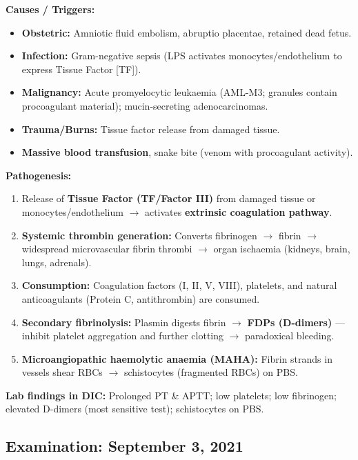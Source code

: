 \documentclass[11pt,a4paper]{article}
\begin{document}
\begin{ansbox}
\textbf{Causes / Triggers:}
\begin{itemize}[leftmargin=*]
    \item \textbf{Obstetric:} Amniotic fluid embolism, abruptio placentae, retained dead fetus.
    \item \textbf{Infection:} Gram-negative sepsis (LPS activates monocytes/endothelium to express Tissue Factor [TF]).
    \item \textbf{Malignancy:} Acute promyelocytic leukaemia (AML-M3; granules contain procoagulant material); mucin-secreting adenocarcinomas.
    \item \textbf{Trauma/Burns:} Tissue factor release from damaged tissue.
    \item \textbf{Massive blood transfusion}, snake bite (venom with procoagulant activity).
\end{itemize}

\textbf{Pathogenesis:}
\begin{enumerate}[leftmargin=*]
    \item Release of \textbf{Tissue Factor (TF/Factor III)} from damaged tissue or monocytes/endothelium $\rightarrow$ activates \textbf{extrinsic coagulation pathway}.
    \item \textbf{Systemic thrombin generation:} Converts fibrinogen $\rightarrow$ fibrin $\rightarrow$ widespread microvascular fibrin thrombi $\rightarrow$ organ ischaemia (kidneys, brain, lungs, adrenals).
    \item \textbf{Consumption:} Coagulation factors (I, II, V, VIII), platelets, and natural anticoagulants (Protein C, antithrombin) are consumed.
    \item \textbf{Secondary fibrinolysis:} Plasmin digests fibrin $\rightarrow$ \textbf{FDPs (D-dimers)} --- inhibit platelet aggregation and further clotting $\rightarrow$ paradoxical bleeding.
    \item \textbf{Microangiopathic haemolytic anaemia (MAHA):} Fibrin strands in vessels shear RBCs $\rightarrow$ schistocytes (fragmented RBCs) on PBS.
\end{enumerate}

\textbf{Lab findings in DIC:} Prolonged PT \& APTT; low platelets; low fibrinogen; elevated D-dimers (most sensitive test); schistocytes on PBS.
\end{ansbox}

\subsection{Examination: September 3, 2021}
\end{document}
